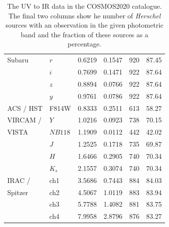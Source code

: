 \begin{table}
\begin{tabular}{p{4cm}|p{1.5cm}|p{2cm}|p{2cm}|p{1.5cm}|p{1.5cm}}
		Subaru & $r$ & 0.6219 & 0.1547 & 920 & 87.45 \\
		& $i$ & 0.7699 & 0.1471 & 922 & 87.64 \\
		& $z$ & 0.8894 & 0.0766 & 922 & 87.64 \\
		& $y$ & 0.9761 & 0.0786 & 922 & 87.64 \\
		\hline
		ACS / HST & F814W & 0.8333 & 0.2511 & 613 & 58.27 \\
		\hline
		VIRCAM / & $Y$ & 1.0216 & 0.0923 & 738 & 70.15 \\
		VISTA & $NB118$ & 1.1909 & 0.0112 & 442 & 42.02 \\
		& $J$ & 1.2525 & 0.1718 & 735 & 69.87 \\
		& $H$ & 1.6466 & 0.2905 & 740 & 70.34 \\
		& $K_s$ & 2.1557 & 0.3074 & 740 & 70.34 \\
		\hline
		IRAC / & ch1 & 3.5686 & 0.7443 & 884 & 84.03 \\
		Spitzer & ch2 & 4.5067 & 1.0119 & 883 & 83.94 \\
		& ch3 & 5.7788 & 1.4082 & 881 & 83.75 \\
		& ch4 & 7.9958 & 2.8796 & 876 & 83.27 \\
		\hline
		\hline
    \end{tabular}
    \caption[UV to IR coverage of our \textit{Herschel} galaxies from COSMOS2020]{The UV to IR data in the COSMOS2020 catalogue. The final two columns show he number of \textit{Herschel} sources with an observation in the given photometric band and the fraction of these sources as a percentage.}
    \label{tab:smg_coverage}
\end{table}

